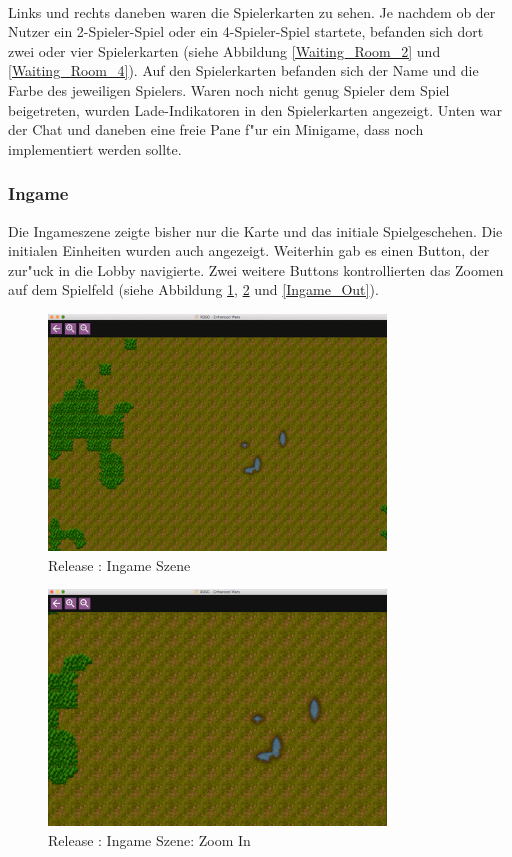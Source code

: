 \documentclass[12pt, titlepage]{scrartcl}
\newcommand{\RN}[1]{%
	\textup{\uppercase\expandafter{\romannumeral#1}}%
}
\begin{document}
			    \ \\ Links und rechts daneben waren die Spielerkarten zu sehen. Je nachdem ob der Nutzer ein 2-Spieler-Spiel oder ein 4-Spieler-Spiel startete, befanden sich dort zwei oder vier Spielerkarten (siehe Abbildung \ref{Waiting_Room_2} und \ref{Waiting_Room_4}). Auf den Spielerkarten befanden sich der Name und die Farbe des jeweiligen Spielers. Waren noch nicht genug Spieler dem Spiel beigetreten, wurden Lade-Indikatoren in den Spielerkarten angezeigt. Unten war der Chat und daneben eine freie Pane f"ur ein Minigame, dass noch implementiert werden sollte.
	        \subsubsection{Ingame}
	            Die Ingameszene zeigte bisher nur die Karte und das initiale Spielgeschehen. Die initialen Einheiten wurden auch angezeigt. Weiterhin gab es einen Button, der zur"uck in die Lobby navigierte. Zwei weitere Buttons kontrollierten das Zoomen auf dem Spielfeld (siehe Abbildung \ref{Ingame}, \ref{Ingame_In} und \ref{Ingame_Out}). \\
	            \begin{figure}[H] 
    				\centering
    				\includegraphics[width=0.8\textwidth]{images/old_state/ingame/Ingame.png}
    				\caption{Release \RN{2}: Ingame Szene}
    				\label{Ingame}
			    \end{figure}
			    \begin{figure}[H] 
    				\centering
    				\includegraphics[width=0.8\textwidth]{images/old_state/ingame/ZoomIn.png}
    				\caption{Release \RN{2}: Ingame Szene: Zoom In}
    				\label{Ingame_In}
			    \end{figure}
\end{document}
